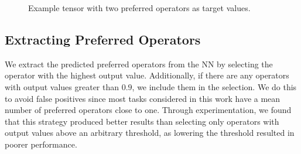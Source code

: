 \documentclass[ppgc,diss,english]{iiufrgs}
\begin{document}
\begin{figure}[tb]
\caption[]{Example tensor with two preferred operators as target values.}
\vspace{\baselineskip}
\centering
{}
\label{fig:po-tensor}
\end{figure}



\subsection{Extracting Preferred Operators}
\label{sec:exp-extracting-pos}
We extract the predicted preferred operators from the NN by selecting the operator with the highest output value. Additionally, if there are any operators with output values greater than $0.9$, we include them in the selection. We do this to avoid false positives since most tasks considered in this work have a mean number of preferred operators close to one. Through experimentation, we found that this strategy produced better results than selecting only operators with output values above an arbitrary threshold, as lowering the threshold resulted in poorer performance.
\end{document}
